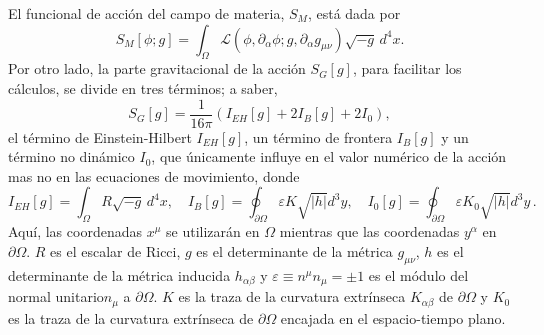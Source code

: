 El funcional de acci\'{o}n del campo de materia, $S_{M}$, est\'{a} dada por
%
\begin{equation}
\label{eq:SM}
S_{M} [\phi; g] = \int_{\Omega} \mathcal{L}(\phi, \partial_{\alpha} \phi; g, \partial_{\alpha} g_{\mu \nu}) \sqrt{-g} \, d^{4} x.
\end{equation}
%
Por otro lado, la parte gravitacional de la acci\'{o}n $S_{G}[g]$, para facilitar los c\'{a}lculos, se divide en tres t\'{e}rminos; a saber,
%
\begin{equation}
\label{eq:SG}
S_{G}[g] = \frac{1}{16 \pi} (I_{EH}[g] + 2 I_{B}[g] + 2 I_{0}),
\end{equation}
%
el t\'{e}rmino de Einstein-Hilbert $I_{EH}[g]$, un t\'{e}rmino de frontera $I_{B}[g]$ y un t\'{e}rmino no din\'{a}mico $I_{0}$, que \'{u}nicamente influye en el valor num\'{e}rico de la acci\'{o}n mas no en las ecuaciones de movimiento, donde
%
\begin{equation*}
I_{EH}[g] = \int_{\Omega} R \sqrt{-g} \, d^{4} x, \quad I_{B}[g] = \oint_{\partial \Omega} \varepsilon K \sqrt{|h|} d^{3} y, \quad I_{0}[g] = \oint_{\partial \Omega} \varepsilon K_{0} \sqrt{|h|} d^{3} y \, .
\end{equation*}
%
Aqu\'{i}, las coordenadas $x^{\mu}$ se utilizar\'{a}n en $\Omega$ mientras que las coordenadas $y^{\alpha}$ en $\partial \Omega$. $R$ es el escalar de Ricci, $g$ es el determinante de la m\'{e}trica $g_{\mu \nu}$, $h$ es el determinante de la m\'{e}trica inducida $h_{\alpha \beta}$ y $\varepsilon \equiv n^{\mu} n_{\mu} = \pm 1$ es el m\'{o}dulo del normal unitario\footnotemark  $n_{\mu}$ a $\partial \Omega$. $K$ es la traza de la curvatura extr\'{i}nseca $K_{\alpha \beta}$ de $\partial \Omega$ y $K_{0}$ es la traza de la curvatura extr\'{i}nseca de $\partial \Omega$ encajada en el espacio-tiempo plano.

